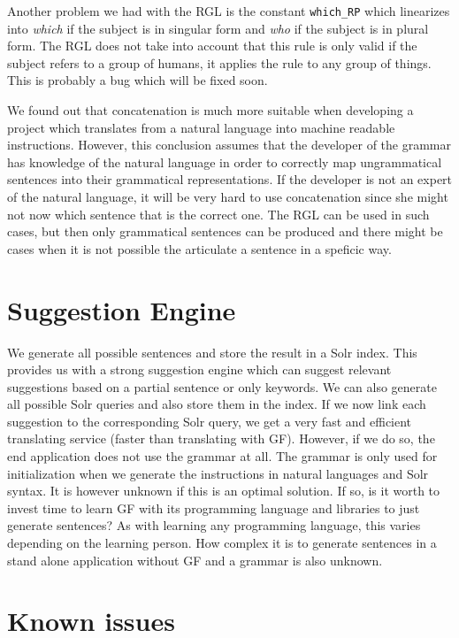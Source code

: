 Another problem we had with the RGL is the constant \texttt{which\_RP} which linearizes into \emph{which} if the subject is in singular form and \emph{who} if the subject is in plural form. The RGL does not take into account that this rule is only valid if the subject refers to a group of humans, it applies the rule to any group of things. This is probably a bug which will be fixed soon.

We found out that concatenation is much more suitable when developing a project which translates from a natural language into machine readable instructions. However, this conclusion assumes that the developer of the grammar has knowledge of the natural language in order to correctly map ungrammatical sentences into their grammatical representations. If the developer is not an expert of the natural language, it will be very hard to use concatenation since she might not now which sentence that is the correct one. The RGL can be used in such cases, but then only grammatical sentences can be produced and there might be cases when it is not possible the articulate a sentence in a speficic way.

\section{Suggestion Engine}
We generate all possible sentences and store the result in a Solr index. This provides us with a strong suggestion engine which can suggest relevant suggestions based on a partial sentence or only keywords. We can also generate all possible Solr queries and also store them in the index. If we now link each suggestion to the corresponding Solr query, we get a very fast and efficient translating service (faster than translating with GF). However, if we do so, the end application does not use the grammar at all. The grammar is only used for initialization when we generate the instructions in natural languages and Solr syntax. It is however unknown if this is an optimal solution. If so, is it worth to invest time to learn GF with its programming language and libraries to just generate sentences? As with learning any programming language, this varies depending on the learning person. How complex it is to generate sentences in a stand alone application without GF and a grammar is also unknown.

\section{Known issues}\label{sec:known-issues}

